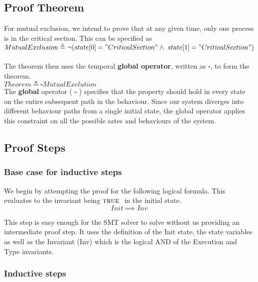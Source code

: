 \documentclass[fleqn]{tukseminar}
\begin{document}
			\subsection{Proof Theorem}
			
			For mutual exclusion, we intend to prove that at any given time, only one process is in the critical section. This can be specified as\\
			
			$MutualExclusion \triangleq \lnot(state[0] = "CriticalSection" \land \  state[1] = "CriticalSection")$\\\\
			The theorem then uses the temporal \textbf{global operator}, written as $\square$, to form the theorem.\\
			
			
			$Theorem \triangleq \square MutualExclution$\\
			
			The \textbf{global} operator ( $\square$ ) specifies that the property should hold in every state on the entire subsequent path in the behaviour. Since our system diverges into different behaviour paths from a single initial state, the global operator applies this constraint on all the possible sates and behaviours of the system.
			
			\subsection{Proof Steps}
			\subsubsection{Base case for inductive steps}
			
			We begin by attempting the proof for the following logical formula. This evaluates to the invariant being $\mbox{\textsc{true }}$ in the initial state. \\
			\begin{equation} \label{eq:1.1}
				Init \implies Inv \tag{<1>1}
			\end{equation}
			
			
			This step is easy enough for the SMT solver to solve without us providing an intermediate proof step. It uses the definition of the Init state, the state variables as well as the Invariant (Inv) which is the logical AND of the Execution and Type invariants.
			
			\subsubsection{Inductive steps}
			
\end{document}
